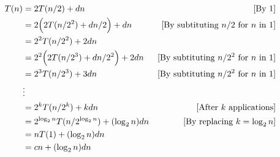 \documentclass[12pt]{article}
\begin{document}
\begin{itemize}
\begin{mdframed}
        \begin{align}
            T(n) &= 2T(n/2) + dn & [\text{By 1}]\\
            &= 2\Bigl(2T(n/2^2) + dn/2\Bigr) + dn & [\text{By subtituting $n/2$ for $n$ in 1}]\\
            &= 2^2T(n/2^2) + 2dn\\
            &= 2^2\Bigl(2T(n/2^3) + dn/2^2\Bigr) + 2dn & [\text{By subtituting $n/2^2$ for $n$ in 1}]\\
            &= 2^3T(n/2^3) + 3dn & [\text{By subtituting $n/2^2$ for $n$ in 1}]\\
            &\vdots\\
            &= 2^kT(n/2^k) + kdn & [\text{After $k$ applications}]\\
            &= 2^{\log_2 n}T(n/2^{\log_2 n}) + (\log_2 n)dn & [\text{By replacing $k = \log_2 n$}]\\
            &= nT(1) + (\log_2 n)dn\\
            &= cn + (\log_2 n)dn
        \end{align}

        \bigskip

    \end{mdframed}

\end{itemize}
\end{document}
